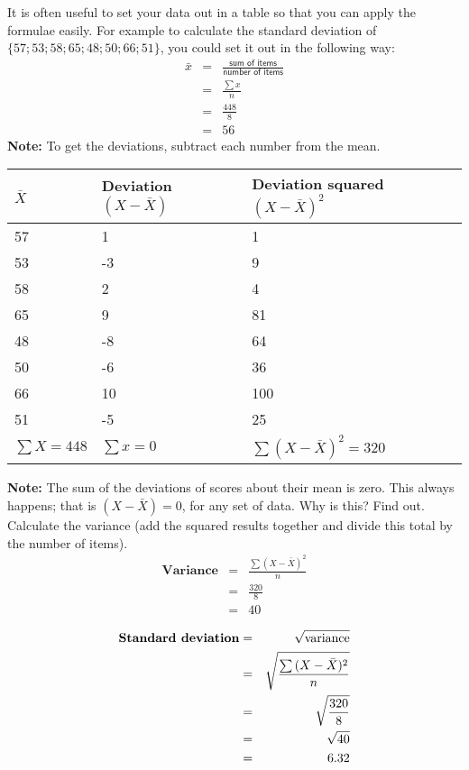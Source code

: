It is often useful to set your data out in a table so that you can apply the formulae easily. For example to calculate the standard deviation of $\{57; 53; 58; 65; 48; 50; 66; 51\}$, you could set it out in the following way: \newline
\begin{eqnarray*}
\bar{x} & = & \frac{\textsf{sum of items}}{\textsf{number of items}} \\
&=& \frac{\sum {x}}{n} \\
&=& \frac{448}{8} \\
&=& 56
\end{eqnarray*}
\textbf{Note:} To get the deviations, subtract each number from the mean.
\begin{center}
\begin{tabular}{|l|l|l|}
\hline
\textbf{$\bar{X}$} & \textbf{Deviation $(X - \bar{X})$} & \textbf{Deviation squared $(X - \bar{X})^2$ } \\
\hline
57 & 1 & 1 \\
53 & -3 & 9 \\
58 & 2 & 4 \\
65 & 9 & 81 \\
48 & -8 & 64 \\
50 & -6 & 36 \\
66 & 10 & 100 \\
51 & -5 & 25 \\
\hline
$\sum{X} = 448$ & $\sum{x} = 0$ & $\sum{(X  - \bar{X})^2} = 320$ \\
\hline
\end{tabular}
\end{center}
\textbf{Note:} The sum of the deviations of scores about their mean is zero. This always happens; that is $(X - \bar{X}) = 0$, for any set of data. Why is this? Find out. \newline
Calculate the variance (add the squared results together and divide this total by the number of items).
\begin{eqnarray*}
\textbf{Variance} & = & \frac{\sum{(X - \bar{X})^2}}{n} \\
&=& \frac{320}{8} \\
&=& 40
\end{eqnarray*}

\begin{eqnarray*}
\textbf{Standard deviation} & = & \sqrt{\rm variance} \\
&=& \sqrt{\frac{\sum{(X - \bar{X})^2}}{n}} \\
&=& \sqrt{\frac{320}{8}} \\
&=& \sqrt{40} \\
&=& 6.32 \\
\end{eqnarray*}

